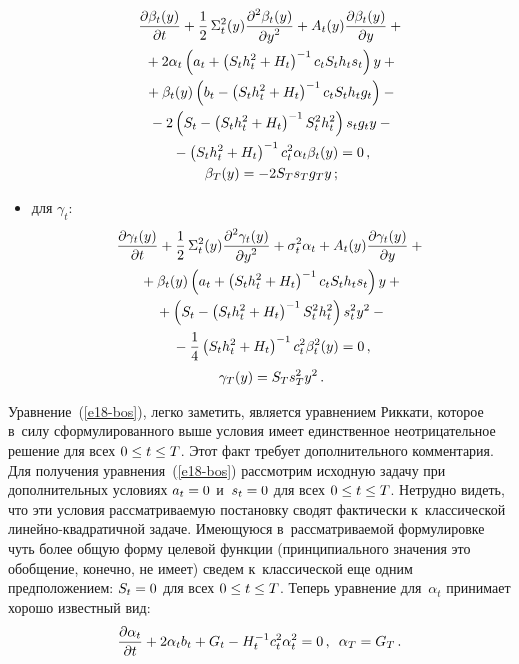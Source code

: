 \begin{multicols}{2}
\begin{itemize}
\noindent
\begin{multline}
\displaystyle\frac{\displaystyle \partial\beta_t(y)\mathstrut}{\displaystyle \partial 
t\mathstrut}+\displaystyle\frac{\displaystyle 1\mathstrut}{\displaystyle 2\mathstrut}\,\Sigma_t^2(y)\displaystyle\frac{\displaystyle \partial^2\beta_t(y)\mathstrut}{\displaystyle \partial y^2\mathstrut} 
+A_t(y)\displaystyle\frac{\displaystyle \partial \beta_t(y)\mathstrut}{\displaystyle \partial y\mathstrut}+{}\\
{}+ 2\alpha_t\left( a_t +\left( S_t h_t^2+H_t\right)^{-1} c_t S_t h_t s_t\right) y+{}\\
{}+
\beta_t(y)\left( b_t -\left( S_t h_t^2 +H_t\right)^{-1} c_t S_t h_t g_t\right)-{}\\
{}-2\left( S_t-\left( S_t h_t^2+H_t\right)^{-1} S_t^2 h_t^2\right) s_t g_t y-{}
\\
{}-
\left( S_t h_t^2+H_t\right)^{-1} c_t^2 \alpha_t \beta_t(y)=0\,,\\
\beta_T(y)=-2S_T s_T g_T y\,;
\label{e19-bos}
\end{multline}
\item  для $\gamma_t$:
\begin{multline}
\hspace*{-0.8pt}\displaystyle\frac{\displaystyle \partial \gamma_t(y)\mathstrut}{\displaystyle \partial t\mathstrut}+\displaystyle\frac{\displaystyle 1\mathstrut}{\displaystyle 2\mathstrut}\,\Sigma_t^2(y)
\displaystyle\frac{\displaystyle \partial^2 \gamma_t(y)\mathstrut}{\displaystyle \partial y^2\mathstrut} +\sigma_t^2 \alpha_t +A_t(y)
\displaystyle\frac{\displaystyle \partial \gamma_t(y)\mathstrut}{\displaystyle \partial y\mathstrut}+{}\\
{}+ \beta_t(y)\left( a_t +\left( S_t h_t^2+H_t\right)^{-1} c_t S_t h_t s_t\right) y+{}\\
{}+
\left( S_t-\left( S_t h_t^2+H_t\right)^{-1} S_t^2 h_t^2\right)  s_t^2 y^2-{}\\
{}-\displaystyle\frac{\displaystyle 1\mathstrut}{\displaystyle 4\mathstrut}\left( S_t h_t^2+H_t\right)^{-1} c_t^2 \beta_t^2(y) =0\,,\\
\gamma_T(y)=S_T s_T^2 y^2\,.
\label{e20-bos}
\end{multline}
\end{itemize}
     
     Уравнение~(\ref{e18-bos}), легко заметить, является уравнением 
Риккати, которое в~силу сформулированного выше условия   
имеет единственное неотрицательное решение для всех $0\hm\leq t\hm\leq T$. 
Этот факт требует дополнительного комментария. Для получения 
уравнения~(\ref{e18-bos}) рас\-смот\-рим исходную задачу при дополнительных 
условиях $a_t\hm=0$ и~$s_t\hm=0$ для всех $0\hm\leq t\hm\leq T$. Нетрудно 
видеть, что эти условия рассматриваемую по\-ста\-нов\-ку сводят фактически 
к~классической ли\-ней\-но-квад\-ра\-тич\-ной задаче. Имеющуюся 
в~рассматриваемой формулировке чуть более общую форму целевой 
функции (принципиального значения это обобщение, конечно, не имеет) 
сведем к~классической еще одним предположением: $S_t\hm=0$ для всех 
$0\hm\leq t\hm\leq T$. Теперь уравнение для~$\alpha_t$ принимает хорошо 
известный вид:
     \begin{equation}
     \displaystyle\frac{\displaystyle \partial \alpha_t\mathstrut}{\displaystyle \partial t\mathstrut}+2\alpha_t b_t +G_t- H_t^{-1} c_t^2 
\alpha_t^2=0\,,\enskip \alpha_T=G_T\,.
     \label{e21-bos}
     \end{equation}


\end{multicols}
